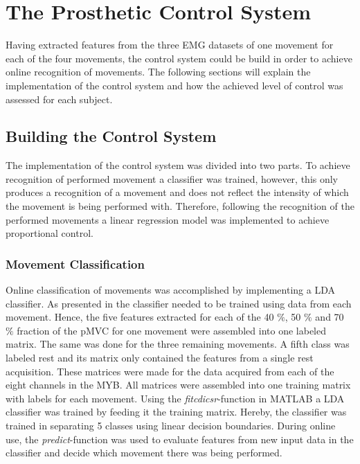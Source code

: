 
\section{The Prosthetic Control System}

Having extracted features from the three EMG datasets of one movement for each of the four movements, the control system could be build in order to achieve online recognition of movements. The following sections will explain the implementation of the control system and how the achieved level of control was assessed for each subject. 

\subsection{Building the Control System} 

The implementation of the control system was divided into two parts. To achieve recognition of performed movement a classifier was trained, however, this only produces a recognition of a movement and does not reflect the intensity of which the movement is being performed with. Therefore, following the recognition of the performed movements a linear regression model was implemented to achieve proportional control. 

\subsubsection{Movement Classification}

Online classification of movements was accomplished by implementing a LDA classifier. As presented in  the classifier needed to be trained using data from each movement. Hence, the five features extracted for each of the 40 $\percent$, 50 $\percent$ and 70 $\percent$ fraction of the pMVC for one movement were assembled into one labeled matrix. The same was done for the three remaining movements. A fifth class was labeled rest and its matrix only contained the features from a single rest acquisition. These matrices were made for the data acquired from each of the eight channels in the MYB. All matrices were assembled into one training matrix with labels for each movement. Using the \textit{fitcdicsr}-function in MATLAB a LDA classifier was trained by feeding it the training matrix. Hereby, the classifier was trained in separating 5 classes using linear decision boundaries. During online use, the \textit{predict}-function was used to evaluate features from new input data in the classifier and decide which movement there was being performed.    


